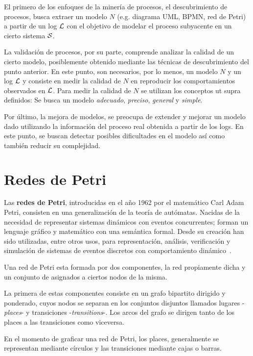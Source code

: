 El primero de los enfoques de la minería de procesos, el descubrimiento de procesos, busca extraer un modelo $N$
(e.g. diagrama UML, BPMN, red de Petri) a partir de un log ${\mathcal L}$ con el objetivo de modelar
el proceso subyacente en un cierto sistema $\mathcal{S}$. 

La validación de procesos, por su parte, comprende analizar la calidad de un cierto modelo,
posiblemente obtenido mediante las técnicas de descubrimiento del punto anterior. En este punto, 
son necesarios, por lo menos, un modelo $N$ y un log ${\mathcal L}$ y consiste en medir la calidad 
de $N$ en reproducir los comportamientos observados en ${\mathcal L}$. Para medir la calidad de $N$ se 
utilizan los conceptos ut supra definidos:
Se busca un modelo \emph{adecuado}, \emph{preciso}, \emph{general} y \emph{simple}.

Por último, la mejora de modelos, se preocupa de extender y mejorar un modelo dado utilizando la información
del proceso real obtenida a partir de los logs. En este punto, se buscan detectar posibles dificultades en 
el modelo así como también reducir su complejidad. 


\section{Redes de Petri}
\label{sec:2.Petrinets}
Las \textbf{redes de Petri}, introducidas en el año 1962 por el matemático
Carl Adam Petri, consisten en una generalización de la teoría de autómatas.
Nacidas de la necesidad de representar sistemas dinámicos con eventos concurrentes;
forman un lenguaje gráfico y matemático con una semántica formal.
Desde su creación han sido utilizadas, entre otros usos, para representación,
análisis, verificación y simulación de sistemas de eventos discretos con 
comportamiento dinámico~\cite{Murata89}.

Una red de Petri esta formada por dos componentes, la red propiamente dicha y un conjunto
de  asignados a ciertos nodos de la misma.

La primera de estas componentes consiste en un grafo bipartito dirigido y ponderado,
cuyos nodos se separan en los conjuntos disjuntos 
llamados lugares -\textit{places}- y transiciones -\textit{transitions}-.
Los arcos del grafo se dirigen tanto de los places a las transiciones como viceversa.

En el momento de graficar una red de Petri, los places, generalmente se
representan mediante círculos y las transiciones mediante cajas o barras.


